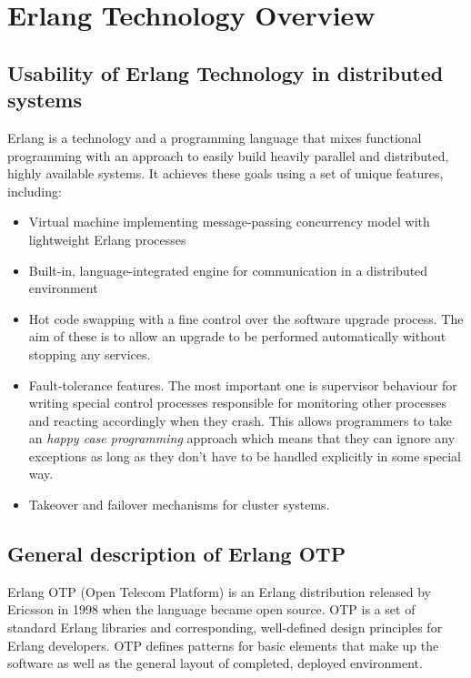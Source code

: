 \section{Erlang Technology Overview}

\subsection{Usability of Erlang Technology in distributed systems}

Erlang is a technology and a programming language that mixes functional programming with
an approach to easily build heavily parallel and distributed, highly available systems. It achieves
these goals using a set of unique features, including:

\begin{itemize}
  \item Virtual machine implementing message-passing concurrency model with
lightweight Erlang processes
  \item Built-in, language-integrated engine for communication in a distributed environment
  \item Hot code swapping with a fine control over the software upgrade process. The aim of these
is to allow an upgrade to be performed automatically without stopping any services.
  \item Fault-tolerance features. The most important one is supervisor behaviour for writing
special control processes responsible for monitoring other processes
and reacting accordingly when they crash. This allows programmers to take an \emph{happy case programming}
approach which means that they can ignore any exceptions as long as they don't have to be handled explicitly in
some special way.
  \item Takeover and failover mechanisms for cluster systems.
\end{itemize}

\subsection{General description of Erlang OTP}

Erlang OTP (Open Telecom Platform) is an Erlang distribution released by Ericsson in 1998
when the language became open source. OTP is a set of standard Erlang libraries and
corresponding, well-defined design principles for Erlang developers. OTP defines patterns
for basic elements that make up the software as well as the general layout of completed,
deployed environment.

